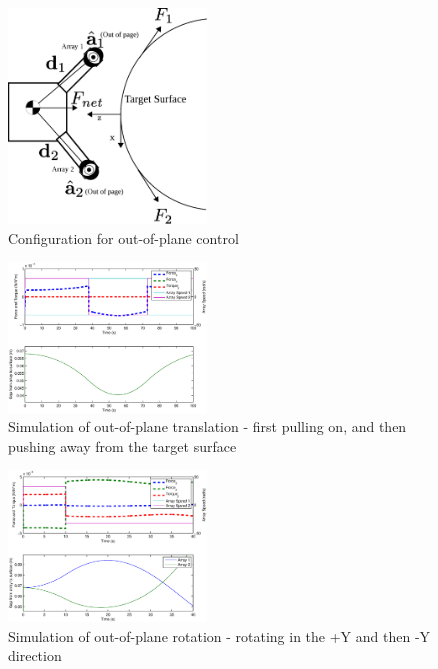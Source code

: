 \documentclass[letterpaper, 10 pt, conference]{ieeeconf}  %
\begin{document}
   \begin{figure}[thpb]
      \centering
      \includegraphics[width = 0.47\textwidth]{figures/curve_locomotion.eps}
      \caption{Configuration for out-of-plane control}
      \label{fig:outofplaneschematic}
   \end{figure}

  \begin{figure}[thpb]
      \centering
      \includegraphics[width = 0.47\textwidth]{figures/curve_translations.eps}
      \caption{Simulation of out-of-plane translation - first pulling on, and then pushing away from the target surface}
      \label{fig:ooptranslation}
   \end{figure}

   \begin{figure}[thpb]
      \centering
      \includegraphics[width = 0.47\textwidth]{figures/curve_rotations.eps}
      \caption{Simulation of out-of-plane rotation - rotating in the +Y and then -Y direction}
      \label{fig:ooprotation}
   \end{figure}
\end{document}
